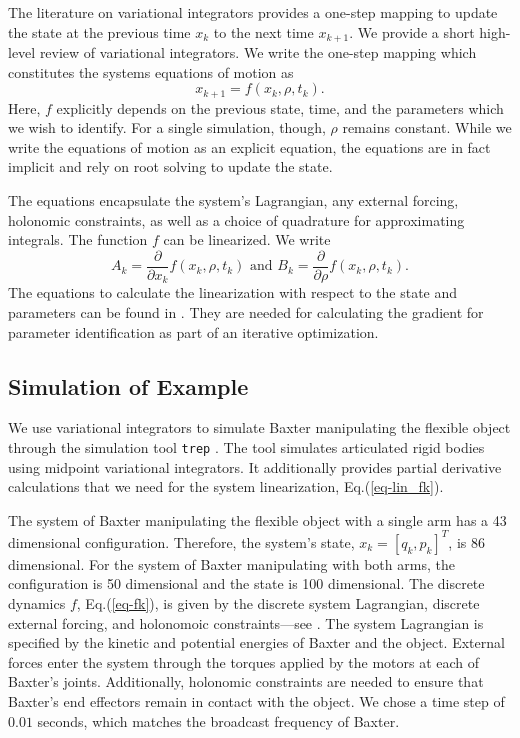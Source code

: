 \documentclass[runningheads,a4paper]{llncs}
\begin{document}
The literature on variational integrators \cite{marsden_west} provides a one-step mapping to update the state at the previous time $x_k$ to the next time $x_{k+1}$.  We provide a short high-level review of variational integrators.  We write the one-step mapping which constitutes the systems equations of motion as 
\begin{equation}
x_{k+1} = f(x_k,\rho,t_k).
\label{eq-fk}
\end{equation}
Here, $f$ explicitly depends on the previous state, time, and the parameters which we wish to identify. For a single simulation, though, $\rho$ remains constant.  While we write the equations of motion as an explicit equation, the equations are in fact implicit and rely on root solving to update the state. 

The equations encapsulate the system's Lagrangian, any external forcing, holonomic constraints, as well as a choice of quadrature for approximating integrals.  The function $f$ can be linearized. We write 
\begin{equation}
A_k = \frac{\partial}{\partial x_k}f(x_k,\rho,t_k) \textrm{ and } B_k = \frac{\partial}{\partial \rho}f(x_k,\rho,t_k).
\label{eq-lin_fk}
\end{equation}
The equations to calculate the linearization with respect to the state and parameters can be found in \cite{caldwell_coleman_correll_iros}. They are needed for calculating the gradient for parameter identification as part of an iterative optimization.

\subsection{Simulation of Example}
We use variational integrators to simulate Baxter manipulating the flexible object through the simulation tool \texttt{trep} \cite{johnson_murphey_scalable}.  The tool simulates articulated rigid bodies using midpoint variational integrators.  It additionally provides partial derivative calculations that we need for the system linearization, Eq.(\ref{eq-lin_fk}). 

The system of Baxter manipulating the flexible object with a single arm has a 43 dimensional configuration. Therefore, the system's state,  $x_k = [q_k,p_k]^T$, is 86 dimensional. For the system of Baxter manipulating with both arms, the configuration is 50 dimensional and the state is 100 dimensional. The discrete dynamics $f$, Eq.(\ref{eq-fk}), is given by the discrete system Lagrangian, discrete external forcing, and holonomoic constraints---see \cite{caldwell_coleman_correll_iros,marsden_west}.  The system Lagrangian is specified by the kinetic and potential energies of Baxter and the object.  External forces enter the system through the torques applied by the motors at each of Baxter's joints.  Additionally, holonomic constraints are needed to ensure that Baxter's end effectors remain in contact with the object.  We chose a time step of $0.01$ seconds, which matches the broadcast frequency of Baxter. 
\end{document}
